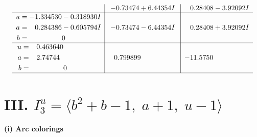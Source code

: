 \documentclass[1p]{elsarticle_modified}
\theoremstyle{definition}
\begin{document}
$$\begin{array}{c|c|c}
 & -0.73474 + 6.44354 I & \phantom{-}0.28408 - 3.92092 I \\ \hline\begin{aligned}
u &= -1.334530 - 0.318930 I \\
a &= \phantom{-}0.284386 - 0.605794 I \\
b &= \phantom{-0.000000 } 0\end{aligned}
 & -0.73474 - 6.44354 I & \phantom{-}0.28408 + 3.92092 I \\ \hline\begin{aligned}
u &= \phantom{-}0.463640\phantom{ +0.000000I} \\
a &= \phantom{-}2.74744\phantom{ +0.000000I} \\
b &= \phantom{-0.000000 } 0\end{aligned}
 & \phantom{-}0.799899\phantom{ +0.000000I} & -11.5750\phantom{ +0.000000I}\\
 \hline 
 \end{array}$$\newpage\newpage\renewcommand{\arraystretch}{1}
\centering \section*{III. $I^u_{3}= \langle b^2+b-1,\;a+1,\;u-1 \rangle$}
\flushleft \textbf{(i) Arc colorings}\\
\end{document}

